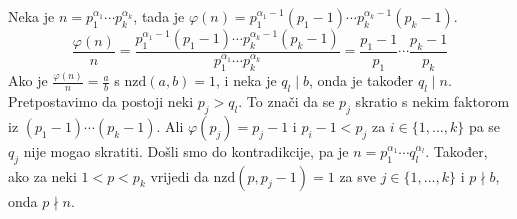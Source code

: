 \documentclass{exam}
\begin{document}
\begin{questions}

\begin{solution}
  Neka je $n = p_1^{\alpha_1} \cdots p_k^{\alpha_k}$, tada je $\varphi(n) = p_1^{\alpha_1 - 1}(p_1 - 1) \cdots p_k^{\alpha_k - 1}(p_k - 1)$.
  \[
    \displaystyle \frac{\varphi(n)}{n} = \frac{p_1^{\alpha_1 - 1}(p_1 - 1) \cdots p_k^{\alpha_k - 1}(p_k - 1)}{p_1^{\alpha_1} \cdots p_k^{\alpha_k}} = \frac{p_1 - 1}{p_1} \cdots \frac{p_k - 1}{p_k}
  \]
  Ako je $\displaystyle \frac{\varphi(n)}{n} = \frac{a}{b}$ s $\text{nzd}(a, b) = 1$, i neka je $q_l \mid b$, onda je također $q_l \mid n$. Pretpostavimo da postoji neki $p_j > q_l$. To znači da se $p_j$ skratio s nekim faktorom iz $(p_1 - 1) \cdots (p_k - 1)$. Ali $\varphi(p_j) = p_j - 1$ i $p_i - 1 < p_j$ za $i \in \{1, \dots, k\}$ pa se $q_j$ nije mogao skratiti. Došli smo do kontradikcije, pa je $n = p_1^{\alpha_1} \cdots q_l^{\alpha_l}$. Također, ako za neki $1 < p < p_k$ vrijedi da $\text{nzd}(p, p_j - 1) = 1$ za sve $j \in \{1, \dots, k\}$ i $p \nmid b$, onda $p \nmid n$.
\end{solution}
\end{questions}
\end{document}
